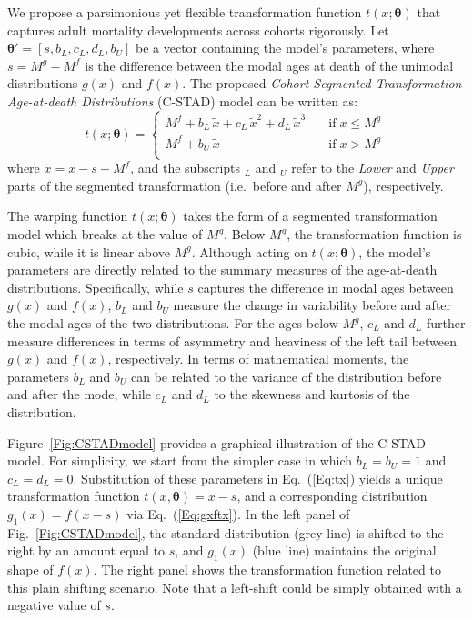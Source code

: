 \documentclass[11pt, a4paper]{article}
\begin{document}
We propose a parsimonious yet flexible transformation function $t(x;\bm{\theta})$ that captures adult mortality developments across cohorts rigorously. Let $\bm{\theta}' = \left[s,b_{L},c_{L},d_{L},b_{U}\right]$ be a vector containing the model's parameters, where $s = M^{g} - M^{f}$ is the difference between the modal ages at death of the unimodal distributions $g(x)$ and $f(x)$. The proposed \emph{Cohort Segmented Transformation Age-at-death Distributions} (C-STAD) model can be written as: 
%
\begin{equation}\label{Eq:tx}
t(x;\bm{\theta}) = \left\{ \begin{array}{ll}
M^{f} + b_{L}\,\tilde{x} + c_{L}\,\tilde{x}^2 + d_{L}\,\tilde{x}^3 \quad & \mathrm{if} \; x \leq M^{g} \, \\
M^{f} + b_{U}\,\tilde{x} \quad & \mathrm{if} \; x > M^{g} \\
\end{array}
\right.
\end{equation} 
%
where $\tilde{x}=x - s - M^{f}$, and the subscripts $_L$ and $_U$ refer to the \textit{Lower} and \textit{Upper} parts of the segmented transformation (i.e.~before and after $M^{g}$), respectively. \par

The warping function $t(x;\bm{\theta})$ takes the form of a segmented transformation model which breaks at the value of $M^{g}$. Below $M^{g}$, the transformation function is cubic, while it is linear above $M^{g}$. Although acting on $t(x;\bm{\theta})$, the model's parameters are directly related to the summary measures of the age-at-death distributions. Specifically, while $s$ captures the difference in modal ages between $g(x)$ and $f(x)$, $b_L$ and $b_U$ measure the change in variability before and after the modal ages of the two distributions. For the ages below $M^{g}$, $c_L$ and $d_L$ further measure differences in terms of asymmetry and heaviness of the left tail between $g(x)$ and $f(x)$, respectively. In terms of mathematical moments, the parameters $b_L$ and $b_U$ can be related to the variance of the distribution before and after the mode, while $c_L$ and $d_L$ to the skewness and kurtosis of the distribution. \par

Figure~\ref{Fig:CSTADmodel} provides a graphical illustration of the C-STAD model. For simplicity, we start from the simpler case in which $b_L = b_U = 1$ and $c_L = d_L = 0$. Substitution of these parameters in Eq.~(\ref{Eq:tx}) yields a unique transformation function $t(x,\bm{\theta})=x-s$, and a corresponding distribution $g_1(x) = f(x-s)$ via Eq.~(\ref{Eq:gxftx}). In the left panel of Fig.~\ref{Fig:CSTADmodel}, the standard distribution (grey line) is shifted to the right by an amount equal to $s$, and $g_1(x)$ (blue line) maintains the original shape of $f(x)$. The right panel shows the transformation function related to this plain shifting scenario. Note that a left-shift could be simply obtained with a negative value of $s$. \par
\end{document}

